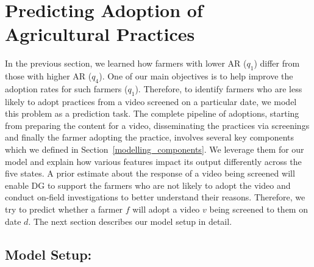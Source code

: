 \documentclass[manuscript,screen]{acmart}
\begin{document}
\section{Predicting Adoption of Agricultural Practices}\label{predicting_adoptions}

In the previous section, we learned how farmers with lower AR ($q_{1}$) differ from those with higher AR ($q_{4}$). One of our main objectives is to help improve the adoption rates for such farmers ($q_{1}$). Therefore, to identify farmers who are less likely to adopt practices from a video screened on a particular date, we model this problem as a prediction task. The complete pipeline of adoptions, starting from preparing the content for a video, disseminating the practices via screenings and finally the farmer adopting the practice, involves several key components which we defined in Section~\ref{modelling_components}. We leverage them for our model and explain how various features impact its output differently across the five states. A prior estimate about the response of a video being screened will enable DG to support the farmers who are not likely to adopt the video and conduct on-field investigations to better understand their reasons. Therefore, we try to predict whether a farmer $f$ will adopt a video $v$ being screened to them on date $d$. The next section describes our model setup in detail.

\subsection{Model Setup:}\label{model_setup}

\end{document}
